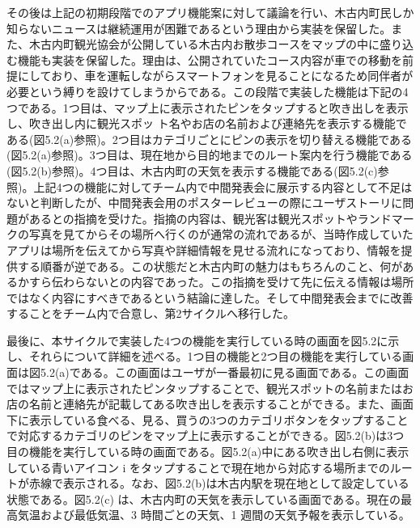 その後は上記の初期段階でのアプリ機能案に対して議論を行い、木古内町民しか知らないニュースは継続運用が困難であるという理由から実装を保留した。また、木古内町観光協会が公開している木古内お散歩コースをマップの中に盛り込む機能も実装を保留した。理由は、公開されていたコース内容が車での移動を前提にしており、車を運転しながらスマートフォンを見ることになるため同伴者が必要という縛りを設けてしまうからである。この段階で実装した機能は下記の4つである。1つ目は、マップ上に表示されたピンをタップすると吹き出しを表示し、吹き出し内に観光スポッ ト名やお店の名前および連絡先を表示する機能である(図5.2(a)参照)。2つ目はカテゴリごとにピンの表示を切り替える機能である(図5.2(a)参照)。3つ目は、現在地から目的地までのルート案内を行う機能である(図5.2(b)参照)。4つ目は、木古内町の天気を表示する機能である(図5.2(c)参照)。上記4つの機能に対してチーム内で中間発表会に展示する内容として不足はないと判断したが、中間発表会用のポスターレビューの際にユーザストーリに問題があるとの指摘を受けた。指摘の内容は、観光客は観光スポットやランドマークの写真を見てからその場所へ行くのが通常の流れであるが、当時作成していたアプリは場所を伝えてから写真や詳細情報を見せる流れになっており、情報を提供する順番が逆である。この状態だと木古内町の魅力はもちろんのこと、何があるかすら伝わらないとの内容であった。この指摘を受けて先に伝える情報は場所ではなく内容にすべきであるという結論に達した。そして中間発表会までに改善することをチーム内で合意し、第2サイクルへ移行した。\par

最後に、本サイクルで実装した4つの機能を実行している時の画面を図5.2に示し、それらについて詳細を述べる。1つ目の機能と2つ目の機能を実行している画面は図5.2(a)である。この画面はユーザが一番最初に見る画面である。この画面ではマップ上に表示されたピンタップすることで、観光スポットの名前またはお店の名前と連絡先が記載してある吹き出しを表示することができる。また、画面下に表示している食べる、見る、買うの3つのカテゴリボタンをタップすることで対応するカテゴリのピンをマップ上に表示することができる。図5.2(b)は3つ目の機能を実行している時の画面である。図5.2(a)中にある吹き出し右側に表示している青いアイコン i をタップすることで現在地から対応する場所までのルートが赤線で表示される。なお、図5.2(b)は木古内駅を現在地として設定している状態である。図5.2(c) は、木古内町の天気を表示している画面である。現在の最高気温および最低気温、3 時間ごとの天気、1 週間の天気予報を表示している。

